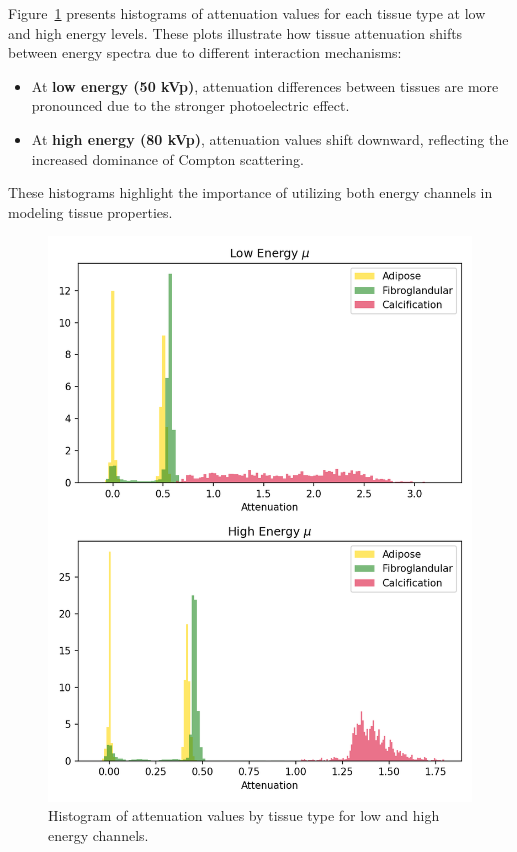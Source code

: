 Figure~\ref{fig:histograms} presents histograms of attenuation values for each tissue type at low and high energy levels.
These plots illustrate how tissue attenuation shifts between energy spectra due to different interaction mechanisms:

\begin{itemize}
    \item At \textbf{low energy (50 kVp)}, attenuation differences between tissues are more pronounced due to the stronger photoelectric effect.
    \item At \textbf{high energy (80 kVp)}, attenuation values shift downward, reflecting the increased dominance of Compton scattering.
\end{itemize}

These histograms highlight the importance of utilizing both energy channels in modeling tissue properties.

\begin{figure}[h!]
    \centering
    \includegraphics[width=\linewidth]{../fig/attenuation_histograms.png}
    \caption{Histogram of attenuation values by tissue type for low and high energy channels.}
    \label{fig:histograms}
\end{figure}

